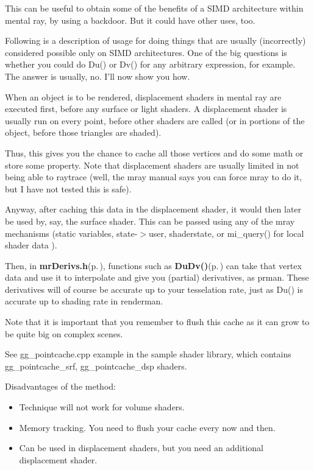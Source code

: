 This can be useful to obtain some of the benefits of a SIMD architecture within mental ray, by using a backdoor. But it could have other uses, too.

Following is a description of usage for doing things that are usually (incorrectly) considered possible only on SIMD architectures. One of the big questions is whether you could do Du() or Dv() for any arbitrary expression, for example. The answer is usually, no. I'll now show you how.

When an object is to be rendered, displacement shaders in mental ray are executed first, before any surface or light shaders. A displacement shader is usually run on every point, before other shaders are called (or in portions of the object, before those triangles are shaded).

Thus, this gives you the chance to cache all those vertices and do some math or store some property. Note that displacement shaders are usually limited in not being able to raytrace (well, the mray manual says you can force mray to do it, but I have not tested this is safe).

Anyway, after caching this data in the displacement shader, it would then later be used by, say, the surface shader. This can be passed using any of the mray mechanisms (static variables, state-$>$user, shaderstate, or mi\_\-query() for local shader data ).

Then, in {\bf mr\-Derivs.h}{\rm (p.\,\pageref{mrDerivs_8h})}, functions such as {\bf Du\-Dv()}{\rm (p.\,\pageref{namespacemr_a42})} can take that vertex data and use it to interpolate and give you (partial) derivatives, as prman. These derivatives will of course be accurate up to your tesselation rate, just as Du() is accurate up to shading rate in renderman.

Note that it is important that you remember to flush this cache as it can grow to be quite big on complex scenes.

See gg\_\-pointcache.cpp example in the sample shader library, which contains gg\_\-pointcache\_\-srf, gg\_\-pointcache\_\-dsp shaders.

Disadvantages of the method:\begin{itemize}
\item Technique will not work for volume shaders.\item Memory tracking. You need to flush your cache every now and then.\item Can be used in displacement shaders, but you need an additional displacement shader. \end{itemize}




